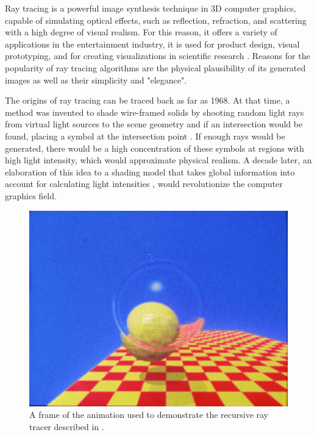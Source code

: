 \label{chap:intro}

Ray tracing is a powerful image synthesis technique in 3D computer graphics, capable of simulating optical effects, such as reflection, refraction, and scattering with a high degree of visual realism. For this reason, it offers a variety of applications in the entertainment industry, it is used for product design, visual prototyping, and for creating visualizations in scientific research \cite[pp 91-128]{peddie2019ray}. Reasons for the popularity of ray tracing algorithms are the physical plausibility of its generated images as well as their simplicity and "elegance". 

The origins of ray tracing can be traced back as far as 1968. At that time, a method was invented to shade wire-framed solids by shooting random light rays from virtual light sources to the scene geometry and if an intersection would be found, placing a symbol at the intersection point \cite{appel1968some}. If enough rays would be generated, there would be a high concentration of these symbols at regions with high light intensity, which would approximate physical realism. 
A decade later, an elaboration of this idea to a shading model that takes global information into account for calculating light intensities \cite{whitted1979improved}, would revolutionize the computer graphics field.

\begin{figure}
	\centering
	\includegraphics[width=.7\linewidth]{img/0 introduction/whitted_}
	\caption{A frame of the animation used to demonstrate the recursive ray tracer described in \cite{whitted1979improved}.\cite{raytracingvideo}}
	\label{fig:g}
\end{figure}

